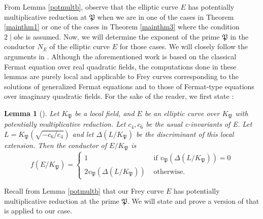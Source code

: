 \documentclass[]{article}
\newtheorem{lemma}{Lemma}
\newcommand {\mfp}{{\mathfrak{P}}}
\newcounter{cases}
\begin{document}
From Lemma \ref{potmultb}, observe that the elliptic curve $E$ has potentially multiplicative reduction at $\mfp$ when we are in one of the cases in Theorem \ref{mainthm1} or one of the cases in Theorem \ref{mainthm3} where the condition $2\mid abc$ is assumed. Now, we will determine the exponent of the prime $\mfp$ in the conductor $N_E$ of the elliptic curve $E$ for those cases. We will closely follow the arguments in \cite[Lemma 4.3 \& Lemma 4.4]{freitas2015fermat}. Although the aforementioned work is based on the classical Fermat equation over real quadratic fields, the computations done in these lemmas are purely local and applicable to Frey curves corresponding to the solutions of generalized Fermat equations and to those of Fermat-type equations over imaginary quadratic fields. For the sake of the reader, we first state \cite[Lemma 4.3]{freitas2015fermat}:

\begin{lemma}[{\cite[Lemma 4.3]{freitas2015fermat}}]\label{samir4.3}
    Let $K_{\mathfrak{P}}$ be a local field, and $E$ be an elliptic curve over $K_{\mathfrak{P}}$ with potentially multiplicative reduction. Let $c_4, c_6$ be the usual c-invariants of E. Let $L=K_{\mathfrak{P}}\left(\sqrt{-c_6 / c_4}\right)$ and let $\Delta\left(L / K_{\mathfrak{P}}\right)$ be the discriminant of this local extension. Then the conductor of $E / K_{\mathfrak{P}}$ is
$$
f\left(E / K_{\mathfrak{P}}\right)= \begin{cases}1 & \text { if } v_{\mathfrak{P}}\left(\Delta\left(L / K_{\mathfrak{P}}\right)\right)=0 \\ 2 v_{\mathfrak{P}}\left(\Delta\left(L / K_{\mathfrak{P}}\right)\right) & \text { otherwise. }\end{cases}
$$
\end{lemma}

Recall from Lemma \ref{potmultb} that our Frey curve $E$ has potentially multiplicative reduction at the prime $\mfp$. We will state and prove a version of \cite[Lemma 4.4]{freitas2015fermat} that is applied to our case.
\end{document}
